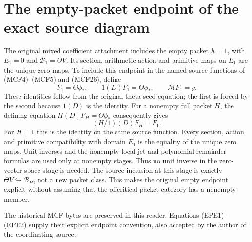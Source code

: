 \section{The empty-packet endpoint of the exact source diagram}
\label{sec:EPE}
The original mixed coefficient attachment includes the empty packet
$h=1$, with $E_1=0$ and $\mathscr B_1=\Theta V$. Its section,
arithmetic-action and primitive maps on $E_1$ are the unique zero maps.
To include this endpoint in the named source functions of
(MCF4)--(MCF5) and (MCF26), define
\[
 F_1=\Theta\phi_*,\qquad 1(D)F_1=\Theta\phi_*,\qquad
 \mathcal MF_1=g.
 \tag{EPE1}
\]
These identities follow from the original theta seed equation; the
first is forced by the second because $1(D)$ is the identity.
For a nonempty full packet $H$, the defining equation
$H(D)F_H=\Theta\phi_*$ consequently gives
\[
 (H/1)(D)F_H=F_1.
 \tag{EPE2}
\]
For $H=1$ this is the identity on the same source function.
Every section, action and primitive compatibility with domain $E_1$
is the equality of the unique zero maps. Unit inverses and the
nonempty local jet and polynomial-remainder formulas are used only
at nonempty stages. Thus no unit inverse in the zero-vector-space
stage is needed. The source inclusion at this stage is exactly
$\Theta V\hookrightarrow\mathscr B_H$, not a new packet class.
This makes the original empty endpoint explicit without assuming
that the offcritical packet category has a nonempty member.

The historical MCF bytes are preserved in this reader. Equations
(EPE1)--(EPE2) supply their explicit endpoint convention, also
accepted by the author of the coordinating source.

